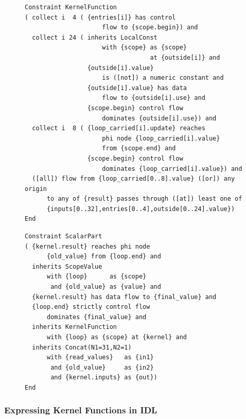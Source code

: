 \begin{figure}[p]
\begin{lstlisting}[language=IDL]
Constraint KernelFunction
( collect i  4 ( {entries[i]} has control
                     flow to {scope.begin}) and
  collect i 24 ( inherits LocalConst
                     with {scope} as {scope}
                                  at {outside[i]} and
                 {outside[i].value}
                     is ([not]) a numeric constant and
                 {outside[i].value} has data
                     flow to {outside[i].use} and
                 {scope.begin} control flow
                     dominates {outside[i].use}) and
  collect i  8 ( {loop_carried[i].update} reaches
                     phi node {loop_carried[i].value}
                     from {scope.end} and
                 {scope.begin} control flow
                     dominates {loop_carried[i].value}) and
  ([all]) flow from {loop_carried[0..8].value} ([or]) any origin
      to any of {result} passes through ([at]) least one of
      {inputs[0..32],entries[0..4],outside[0..24].value})
End
\end{lstlisting}
\begin{lstlisting}[language=IDL,label={IDLscalarPart},caption=
   {IDL specifications of a kernel function and a scalar reduction within a
    CReHC:
    In ``{\tt ScalarPart}'', the kernel function operates in a loop.
    Its input ``{\tt kernel.inputs}'' is composed of ``{\tt read\_values}'' and
    the reduction value of the previous iteration, concatenated with
    ``{\tt Concat}''.}]
Constraint ScalarPart
( {kernel.result} reaches phi node
      {old_value} from {loop.end} and
  inherits ScopeValue
      with {loop}      as {scope}
       and {old_value} as {value} and
  {kernel.result} has data flow to {final_value} and
  {loop.end} strictly control flow
      dominates {final_value} and
  inherits KernelFunction
      with {loop} as {scope} at {kernel} and
  inherits Concat(N1=31,N2=1)
      with {read_values}   as {in1}
       and {old_value}     as {in2}
       and {kernel.inputs} as {out})
End
\end{lstlisting}
\end{figure}

\subsubsection{Expressing Kernel Functions in IDL}

